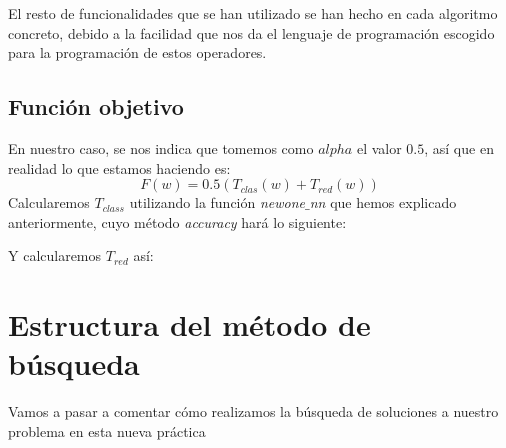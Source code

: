 \documentclass[11pt]{article}
\makeatletter
\def\BState{\State\hskip-\ALG@thistlm}
\makeatother
\begin{document}
El resto de funcionalidades que se han utilizado se han hecho en cada algoritmo concreto, debido a la facilidad que nos da el lenguaje de programación escogido para la programación de estos operadores.

\subsection{Función objetivo}
En nuestro caso, se nos indica que tomemos como $alpha$ el valor $0.5$, así que en realidad lo que estamos haciendo es:
\[
F(w) = 0.5(T_{clas}(w) + T_{red}(w))
\]
Calcularemos $T_{class}$ utilizando la función \emph{newone$\_$nn} que hemos explicado anteriormente, cuyo método \emph{accuracy} hará lo siguiente:\\
Y calcularemos $T_{red}$ así:\\

\newpage
\section{Estructura del método de búsqueda}

Vamos a pasar a comentar cómo realizamos la búsqueda de soluciones a nuestro problema en esta nueva práctica
\end{document}
